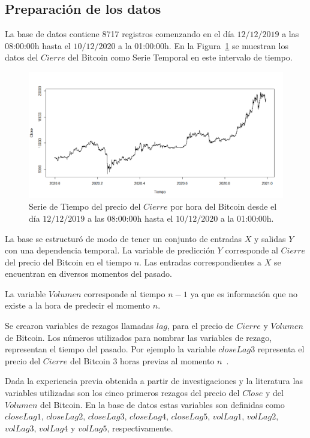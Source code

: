 \documentclass[a4paper,12pt,twocolumn]{article}
\begin{document}
\subsection{Preparación de los datos}

La base de datos contiene 8717 registros comenzando en el día $12/12/2019$ a las 08:00:00h hasta el $10/12/2020$ a la 01:00:00h. En la Figura~\ref{priceClose} se muestran los datos del $Cierre$ del Bitcoin como Serie Temporal en este intervalo de tiempo. 

\begin{figure}[!hbt]
\centering
\includegraphics[width=1\textwidth]{serie}
\caption{Serie de Tiempo del precio del $Cierre$ por hora del Bitcoin desde el día $12/12/2019$ a las 08:00:00h hasta el $10/12/2020$ a la 01:00:00h.}
\label{priceClose}
\end{figure}


La base se estructuró de modo de tener un conjunto de entradas $X$ y salidas $Y$ con una dependencia temporal. La variable de predicción $Y$ corresponde al $Cierre$ del precio del Bitcoin en el tiempo $n$. Las entradas correspondientes a $X$ se encuentran en diversos momentos del pasado. 

La variable $Volumen$ corresponde al tiempo $n-1$ ya que es información que no existe a la hora de predecir el momento $n$.

Se crearon variables de rezagos llamadas $lag$, para el precio de $Cierre$ y $Volumen$ de Bitcoin. Los números utilizados para nombrar las variables de rezago, representan el tiempo del pasado. Por ejemplo la variable $closeLag3$ representa el precio del $Cierre$ del Bitcoin 3 horas previas al momento $n$~\cite{forecastinBitcoinClosing}.  

Dada la experiencia previa obtenida a partir de investigaciones y la literatura las variables utilizadas son los cinco primeros rezagos del precio del $Close$ y del $Volumen$ del Bitcoin. En la base de datos estas variables son definidas como $closeLag1$, $closeLag2$, $closeLag3$, $closeLag4$, $closeLag5$, $volLag1$, $volLag2$, $volLag3$, $volLag4$ y $volLag5$, respectivamente.
\end{document}
